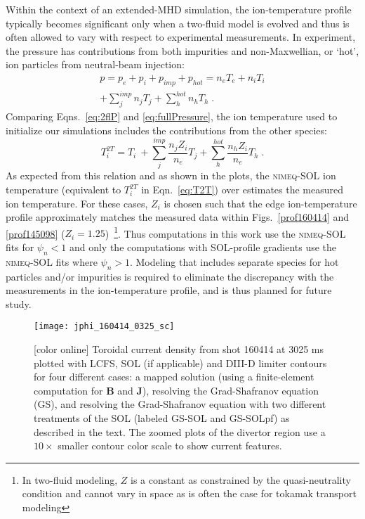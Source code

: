 \documentclass[english,aps,superscriptaddress,showkeys,showpacs,prepri,twocolumn]{revtex4}
\begin{document}
Within the context of an extended-MHD simulation, the ion-temperature profile
typically becomes significant only when a two-fluid model is evolved and thus
is often allowed to vary with respect to experimental measurements.  In 
experiment, the pressure has contributions from both impurities and 
non-Maxwellian, or `hot', ion particles from neutral-beam injection:
\begin{multline}
      p=p_e + p_i + p_{imp} + p_{hot} =  n_e T_e + n_i T_i  \\
      + \sum_j^{imp} n_j T_j + \sum_h^{hot} n_h T_h\;.
      \label{eq:fullPressure}
\end{multline}
Comparing Eqns.~\eqref{eq:2flP} and \eqref{eq:fullPressure}, the ion temperature used
to initialize our simulations includes the contributions from the other species: 
\begin{equation}
      T^{2T}_i= T_i \
      + \sum_j^{imp} \frac{n_j Z_i}{n_e} T_j
      + \sum_h^{hot} \frac{n_h Z_i}{n_e} T_h\;.
      \label{eq:T2T}
\end{equation}
As expected from this relation and as shown in the plots, the
\textsc{nimeq}-SOL ion temperature (equivalent to $T^{2T}_i$ in
Eqn.~\eqref{eq:T2T}) over estimates
the measured ion temperature.  For these cases, $Z_i$ is chosen such that the
edge ion-temperature profile approximately matches the measured data within
Figs.~\ref{prof160414} and \ref{prof145098}
($Z_i=1.25$)~\footnote{In two-fluid modeling, $Z$ is a constant as constrained
by the quasi-neutrality condition and cannot vary in space as is often the case
for tokamak transport modeling}.  Thus computations in this work use the
\textsc{nimeq}-SOL fits for $\psi_n<1$ and only the computations with
SOL-profile gradients use the \textsc{nimeq}-SOL fits where $\psi_n>1$.
Modeling that includes separate species for hot particles and/or impurities is
required to eliminate the discrepancy with the measurements in the
ion-temperature profile, and is thus planned for future study.

\begin{figure*}
\begin{center}
\texttt{[image: jphi\_160414\_0325\_sc]}
\caption{ [color online]
Toroidal current density from shot 160414 at 3025 ms plotted with LCFS, SOL (if
applicable) and DIII-D limiter contours for four different cases: a mapped
solution (using a finite-element computation for $\mathbf{B}$ and
$\mathbf{J}$), resolving the Grad-Shafranov equation (GS), and resolving the
Grad-Shafranov equation with two different treatments of the SOL (labeled GS-SOL and
GS-SOLpf) as described in the text. The zoomed plots of the divertor region use
a $10\times$ smaller contour color scale to show current features.
}
\label{fig:jphi160414}
\end{center}
\end{figure*}
\end{document}
